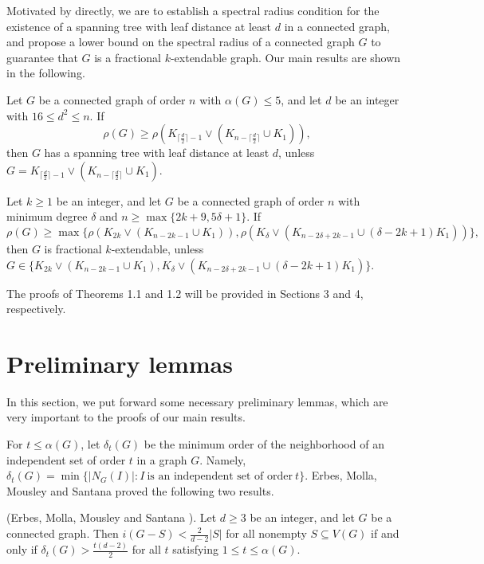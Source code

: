 \documentclass[10pt]{article}
\numberwithin{equation}{section}
\begin{document}
Motivated by \cite{Os,EMMS,ML} directly, we are to establish a spectral radius condition for the existence of a spanning tree with leaf distance at
least $d$ in a connected graph, and propose a lower bound on the spectral radius of a connected graph $G$ to guarantee that $G$ is a fractional
$k$-extendable graph. Our main results are shown in the following.

\medskip

 Let $G$ be a connected graph of order $n$ with $\alpha(G)\leq5$, and let $d$ be an integer with $16\leq d^{2}\leq n$.
If
$$
\rho(G)\geq\rho(K_{\lceil\frac{d}{2}\rceil-1}\vee(K_{n-\lceil\frac{d}{2}\rceil}\cup K_1)),
$$
then $G$ has a spanning tree with leaf distance at least $d$, unless $G=K_{\lceil\frac{d}{2}\rceil-1}\vee(K_{n-\lceil\frac{d}{2}\rceil}\cup K_1)$.

\medskip

 Let $k\geq1$ be an integer, and let $G$ be a connected graph of order $n$ with minimum degree $\delta$ and
$n\geq\max\{2k+9,5\delta+1\}$. If
$$
\rho(G)\geq\max\{\rho(K_{2k}\vee(K_{n-2k-1}\cup K_1)), \rho(K_{\delta}\vee(K_{n-2\delta+2k-1}\cup(\delta-2k+1)K_1))\},
$$
then $G$ is fractional $k$-extendable, unless $G\in\{K_{2k}\vee(K_{n-2k-1}\cup K_1),K_{\delta}\vee(K_{n-2\delta+2k-1}\cup(\delta-2k+1)K_1)\}$.

\medskip

The proofs of Theorems 1.1 and 1.2 will be provided in Sections 3 and 4, respectively.


\section{Preliminary lemmas}

In this section, we put forward some necessary preliminary lemmas, which are very important to the proofs of our main results.

For $t\leq\alpha(G)$, let $\delta_t(G)$ be the minimum order of the neighborhood of an independent set of order $t$ in a graph $G$. Namely,
$\delta_t(G)=\min\{|N_G(I)|: I \ \mbox{is an independent set of order} \ t\}$. Erbes, Molla, Mousley and Santana\cite{EMMS} proved the following
two results.

\medskip

 (Erbes, Molla, Mousley and Santana \cite{EMMS}). Let $d\geq3$ be an integer, and let $G$ be a connected graph. Then $i(G-S)<\frac{2}{d-2}|S|$ for all nonempty $S\subseteq V(G)$ if and only if $\delta_t(G)>\frac{t(d-2)}{2}$ for all $t$ satisfying $1\leq t\leq\alpha(G)$.
\end{document}
